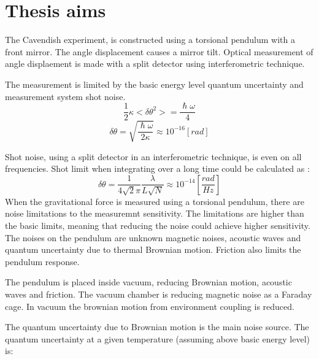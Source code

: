 \documentclass[\main/master.tex]{subfiles}
\begin{document}
\chapter{Thesis aims}\label{chp:Thesis aims}

The Cavendish experiment, is constructed using a torsional pendulum with a front mirror. The angle displacement causes a mirror tilt. Optical measurement of angle displaement is made with a split detector using interferometric technique.
\par\noindent
The measurement is limited by the basic energy level quantum uncertainty and measurement system shot noise.
\begin{equation}
\frac{1}{2}\kappa <\delta\theta^2>= \frac{\hslash\omega}{4}    \label{eqn:basic uncertainty}
\end{equation}
\begin{equation}
\delta\theta= \sqrt{\frac{\hslash\omega}{2\kappa}} \approx 10^{-16} [rad]    \label{eqn:basic uncertainty}
\end{equation}

\noindent
Shot noise, using a split detector in an interferometric technique, is even on all frequencies. Shot limit when integrating over a long time could be calculated as \cite{howell2019}:
\begin{equation}
\delta\theta = \frac{1}{4\sqrt{2}\pi}\frac{\lambda}{L\sqrt{N}} \approx
10^{-14} [\frac{rad}{Hz}]    \label{eqn:gravitation_torque}
\end{equation}
When the gravitational force is measured using a torsional pendulum, there are noise limitations to the measuremnt sensitivity. The limitations are higher than the basic limits, meaning that reducing the noise could achieve higher sensitivity. The noises on the pendulum are unknown magnetic noises, acoustic waves and quantum uncertainty due to thermal Brownian motion. Friction also limits the pendulum response. 
\par\noindent
The pendulum is placed inside vacuum, reducing Brownian motion, acoustic waves and friction. The vacuum chamber is reducing magnetic noise as a Faraday cage. In vacuum the brownian motion from environment coupling is reduced.
\par\noindent
The quantum uncertainty due to Brownian motion is the main noise source. The quantum uncertainty at a given temperature (assuming above basic energy level) is:
\end{document}
